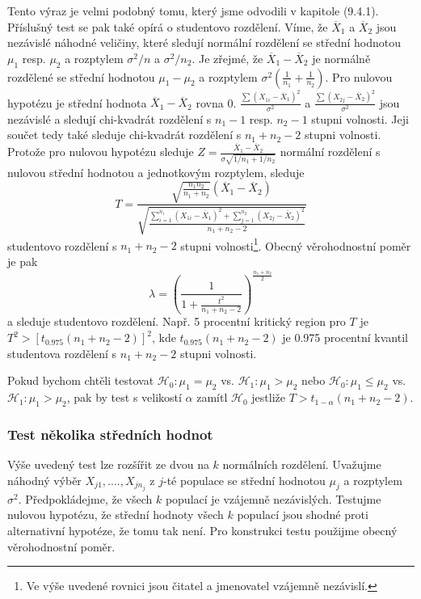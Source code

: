 Tento výraz je velmi podobný tomu, který jsme odvodili v kapitole (9.4.1). Příslušný test se pak také opírá o studentovo rozdělení. Víme, že $\overline{X}_1$ a $\overline{X}_2$ jsou nezávislé náhodné veličiny, které sledují normální rozdělení se střední hodnotou $\mu_1$ resp. $\mu_2$ a rozptylem $\sigma^2/n$ a $\sigma^2/n_2$. Je zřejmé, že $\overline{X}_1 - \overline{X}_2$ je normálně rozdělené se střední hodnotou $\mu_1 - \mu_2$ a rozptylem $\sigma^2\left(\frac{1}{n_1} + \frac{1}{n_2}\right)$. Pro nulovou hypotézu je střední hodnota $\overline{X}_1 - \overline{X}_2$ rovna 0. $\frac{\sum(X_{1i} - \overline{X}_1)^2}{\sigma^2}$ a  $\frac{\sum(X_{2j} - \overline{X}_2)^2}{\sigma^2}$ jsou nezávislé a sledují chi-kvadrát rozdělení s $n_1 - 1$ resp. $n_2 - 1$ stupni volnosti. Jeji součet tedy také sleduje chi-kvadrát rozdělení s $n_1 + n_2 - 2$ stupni volnosti. Protože pro nulovou hypotézu sleduje $Z = \frac{\overline{X}_1 - \overline{X}_2}{\sigma \sqrt{1/n_1 + 1/n_2}}$ normální rozdělení s nulovou střední hodnotou a jednotkovým rozptylem, sleduje
\begin{equation*}
T = \frac{\sqrt{\frac{n_1 n_2}{n_1 + n_2}}(\overline{X}_1 - \overline{X}_2)}{\sqrt{\frac{\sum_{i = 1}^{n_1}(X_{1i} - \overline{X}_1)^2 + \sum_{j = 1}^{n_2}(X_{2j} - \overline{X}_2)^2}{n_1 + n_2 - 2}}}
\end{equation*}
studentovo rozdělení s $n_1 + n_2 - 2$ stupni volnosti\footnote{Ve výše uvedené rovnici jsou čitatel a jmenovatel vzájemně nezávislí.}. Obecný věrohodnostní poměr  je pak
\begin{equation*}
\lambda = \left(\frac{1}{1 + \frac{t^2}{n_1 + n_2 - 2}}\right)^{\frac{n_1 + n_2}{2}}
\end{equation*}
a sleduje studentovo rozdělení. Např. 5 procentní kritický region pro $T$ je $T^2 > [t_{0.975}(n_1 + n_2 - 2)]^2$, kde $t_{0.975}(n_1 + n_2 - 2)$ je 0.975 procentní kvantil studentova rozdělení s $n_1 + n_2 - 2$ stupni volnosti.

Pokud bychom chtěli testovat $\mathscr{H}_0: \mu_1 = \mu_2$ vs. $\mathscr{H}_1: \mu_1 > \mu_2$ nebo $\mathscr{H}_0: \mu_1 \le \mu_2$ vs. $\mathscr{H}_1: \mu_1 > \mu_2$, pak by test s velikostí $\alpha$ zamítl $\mathscr{H}_0$ jestliže $T > t_{1 - \alpha}(n_1 + n_2 - 2)$.

\subsubsection{Test několika středních hodnot}

Výše uvedený test lze rozšířit ze dvou na $k$ normálních rozdělení. Uvažujme náhodný výběr $X_{j1}, ...., X_{jn_j}$ z $j$-té populace se střední hodnotou $\mu_j$ a rozptylem $\sigma^2$. Předpokládejme, že všech $k$ populací je vzájemně nezávislých. Testujme nulovou hypotézu, že střední hodnoty všech $k$ populací jsou shodné proti alternativní hypotéze, že tomu tak není. Pro konstrukci testu použijme obecný věrohodnostní poměr.

